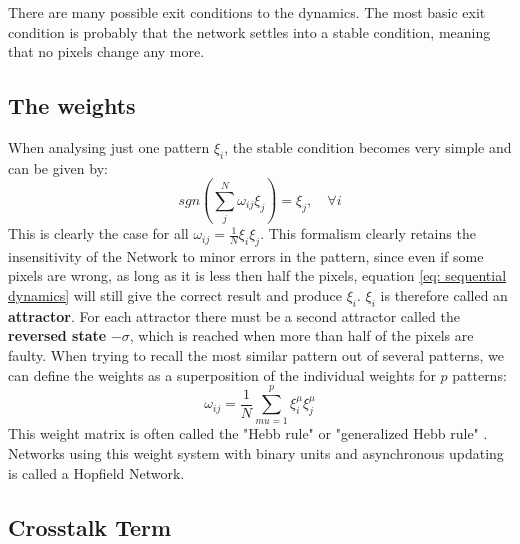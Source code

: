 There are many possible exit conditions to the dynamics. The most basic exit condition is probably that the network settles into a stable condition, meaning that no pixels change any more. 

\subsection{The weights}
When analysing just one pattern $\xi_i$, the stable condition becomes very simple and can be given by:
\begin{equation}
sgn\left( \sum_j^N \omega_{ij} \xi_j \right) = \xi_j, \quad	\forall i
\end{equation}
This is clearly the case for all $\omega_{ij}=\frac{1}{N} \xi_i \xi_j$. This formalism clearly retains the insensitivity of the Network to minor errors in the pattern, since even if some pixels are wrong, as long as it is less then half the pixels, equation \ref{eq: sequential dynamics} will still give the correct result and produce $\xi_i$. $\xi_i$ is therefore called an \textbf{attractor}. For each attractor there must be a second attractor called the \textbf{reversed state} $-\sigma$, which is reached when more than half of the pixels are faulty. 
When trying to recall the most similar pattern out of several patterns, we can define the weights as a superposition of the individual weights for $p$ patterns:
\begin{equation}
\omega_{ij}=\frac{1}{N} \sum_{mu=1}^p \xi_i^\mu \xi_j^\mu
\end{equation}
This weight matrix is often called the "Hebb rule" or "generalized Hebb rule" \citep{Polk:2002fk}. Networks using this weight system with binary units and asynchronous updating is called a Hopfield Network. 

\subsection{Crosstalk Term}



